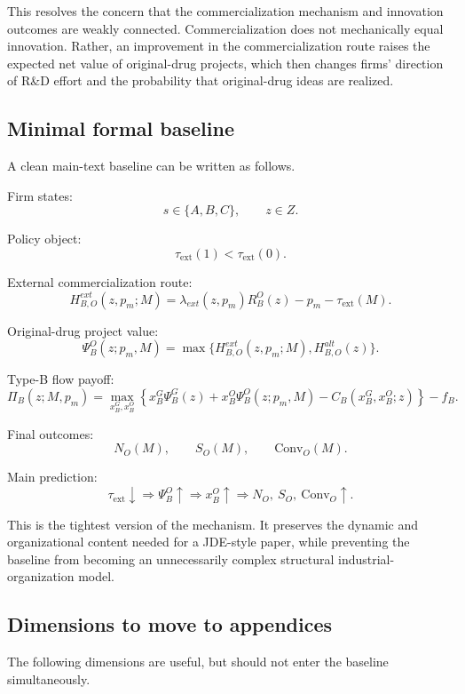 \documentclass[12pt]{article}
\newcommand{\tauext}{\tau_{\mathrm{ext}}}
\newcommand{\Conv}{\mathrm{Conv}}
\begin{document}
This resolves the concern that the commercialization mechanism and innovation outcomes are weakly connected. Commercialization does not mechanically equal innovation. Rather, an improvement in the commercialization route raises the expected net value of original-drug projects, which then changes firms' direction of R\&D effort and the probability that original-drug ideas are realized.

\subsection{Minimal formal baseline}

A clean main-text baseline can be written as follows.

Firm states:
\[
s\in\{A,B,C\},\qquad z\in Z.
\]

Policy object:
\[
\tauext(1)<\tauext(0).
\]

External commercialization route:
\[
H_{B,O}^{ext}(z,p_m;M)
=
\lambda_{ext}(z,p_m)R_B^O(z)-p_m-\tauext(M).
\]

Original-drug project value:
\[
\Psi_B^O(z;p_m,M)
=
\max\{H_{B,O}^{ext}(z,p_m;M),H_{B,O}^{alt}(z)\}.
\]

Type-B flow payoff:
\[
\Pi_B(z;M,p_m)
=
\max_{x_B^G,x_B^O}\left\{
 x_B^G\Psi_B^G(z)
+x_B^O\Psi_B^O(z;p_m,M)
-C_B(x_B^G,x_B^O;z)
\right\}-f_B.
\]

Final outcomes:
\[
N_O(M),\qquad S_O(M),\qquad \Conv_O(M).
\]

Main prediction:
\[
\tauext\downarrow
\Rightarrow
\Psi_B^O\uparrow
\Rightarrow
x_B^O\uparrow
\Rightarrow
N_O,\ S_O,\ \Conv_O\uparrow.
\]

This is the tightest version of the mechanism. It preserves the dynamic and organizational content needed for a JDE-style paper, while preventing the baseline from becoming an unnecessarily complex structural industrial-organization model.

\subsection{Dimensions to move to appendices}

The following dimensions are useful, but should not enter the baseline simultaneously.
\end{document}
